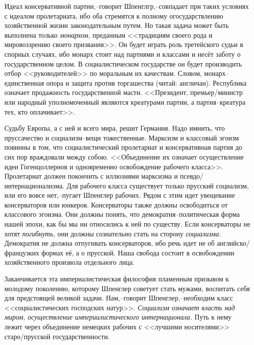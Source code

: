 Идеал консервативной партии,\---говорит Шпенглгр,\---совпадает при таких условиях с идеалом пролетариата, ибо оба стремятся к полному огосударствлению хозяйственной жизни законодательным путем. Но такая задача может быть выполнена только \emph{монархом,} преданным <<традициям своего рода и мировоззрению своего призвания>>. Он будет играть роль третейского судьи в спорных случаях, ибо монарх стоит над партиями и классами и несёт заботу о государственном целом. В социалистическом государстве он будет производить отбор <<руководителей>> по моральным их качествам. Словом, монарх\---единственная опора и защита против торгашества (читай: англичан). Республика означает продажность государственной масти. <<Президент, премьер\-/министр или народный уполномоченный являются креатурами партии, а партия\---креатура тех, кто оплачивает>>.

Судьбу Европы, а с ней и всего мира, решит Германия. Надо имнить, что пруссачество и социализм\---вещи тожественные. Марксизм и классовый эгоизм повинны в том, что социалистический пролетариат и консервативная партия до сих пор враждовали между собою. <<Объединение их означает осуществление идеи Гогенцоллернов и одновременно освобождение рабочего класса>>. Пролетариат должен покончить с иллюзиями марксизма и псевдо\-/интернационализма. Для рабочего класса существует только прусский социализм, или его вовсе нет,\---пугает Шпенглер рабочих. Рядом с этим идет увещевание консерваторов или юнкеров. Консерваторы также должны освободиться от классового эгоизма. Они должны понять, что демократия\---политическая форма нашей эпохи, как бы мы ни относились к ней по существу. Если консерваторы не хотят \emph{погибнуть,} они должны сознательно стать на сторону \emph{социализма.} Демократия не должна отпугивать консерваторов, ибо речь идет не об английско\-/французких формах её, а о прусской. Наша свобода состоит в освобождении хозяйственного произвола отдельного лица.

Заканчивается эта империалистическая философия пламенным призывом к молодому поколению, которому Шпенглер советует стать мужами, воспитать себя для предстоящей великой задачи. Нам,\---говорит Шпенглер,\---необходим класс <<социалистических господских натур>>. \emph{Социализм означает власть над миром, осуществление империилистического интернационала.} Путь к нему лежит через объединение немецких рабочих с <<лучшими носителями>> старо\-/прусской государственности.

\begin{center}
 \noindent\textasteriskcentered\ \textasteriskcentered\ \textasteriskcentered
\end{center}

